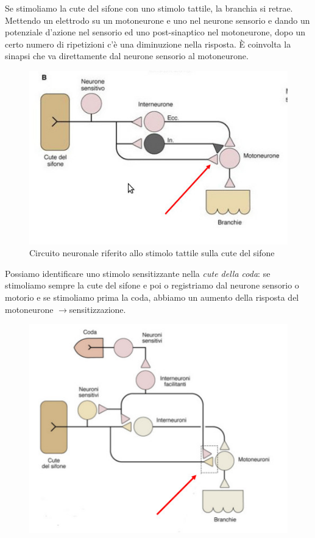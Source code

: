 \documentclass[a4paper,12pt]{article}
\newcommand{\lfreccia}{\ensuremath{\longrightarrow}}
\begin{document}
Se stimoliamo la cute del sifone con uno stimolo tattile, la branchia si retrae. Mettendo un elettrodo su un motoneurone e uno nel neurone sensorio e dando un potenziale d'azione nel sensorio ed uno post-sinaptico nel motoneurone, dopo un certo numero di ripetizioni c'è una diminuzione nella risposta. È coinvolta la sinapsi che va direttamente dal neurone sensorio al motoneurone. 

\begin{figure}[H]
\centering
\includegraphics[scale=0.4]{immagine/lumaca1.jpg}
\caption{Circuito neuronale riferito allo stimolo tattile sulla cute del sifone}
\end{figure}

Possiamo identificare uno stimolo sensitizzante nella \emph{cute della coda}: se stimoliamo sempre la cute del sifone e poi o registriamo dal neurone sensorio o motorio e se stimoliamo prima la coda, abbiamo un aumento della risposta del motoneurone \lfreccia sensitizzazione.
\begin{figure}[H]
\centering
\includegraphics[scale=0.4]{immagine/lumaca2.jpg}
\caption{}
\end{figure}
\end{document}
